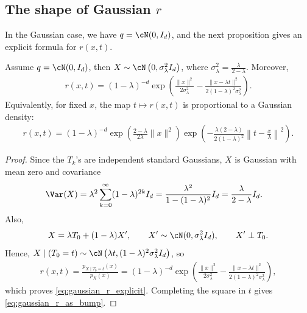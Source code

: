 \subsection{The shape of Gaussian $r$}
In the Gaussian case, we have $q=\cN(0,I_d)$, and the next proposition gives an explicit formula for $r(x,t)$.

\begin{proposition}
    \label{prop:gaussian_relative_density_shape}
    Assume $q=\cN(0,I_d)$, then
    $X\sim \cN\left(0,\sigma_\lambda^2 I_d\right)$, where $\sigma_\lambda^2=\frac{\lambda}{2-\lambda}$.
    Moreover,
    \begin{align}
        r(x,t)
        =
        (1-\lambda)^{-d}
        \exp\left(
        \frac{\|x\|^2}{2\sigma_\lambda^2}
        -
        \frac{\|x-\lambda t\|^2}{2(1-\lambda)^2\sigma_\lambda^2}
        \right).
        \label{eq:gaussian_r_explicit}
    \end{align}
    Equivalently, for fixed $x$, the map $t\mapsto r(x,t)$ is proportional to a Gaussian density:
    \begin{align}
        r(x,t)
        =
        (1-\lambda)^{-d}
        \exp\left(
        \frac{2-\lambda}{2\lambda}\|x\|^2
        \right)
        \exp\left(
        -
        \frac{\lambda(2-\lambda)}{2(1-\lambda)^2}
        \left\|t-\frac{x}{\lambda}\right\|^2
        \right).
        \label{eq:gaussian_r_as_bump}
    \end{align}
\end{proposition}

\begin{proof}
    Since the $T_k$'s are independent standard Gaussians, $X$ is Gaussian with mean zero and covariance
    \begin{align}
        \Var(X)
         & =
        \lambda^2
        \sum_{k=0}^{\infty}
        (1-\lambda)^{2k} I_d
        =
        \frac{\lambda^2}{1-(1-\lambda)^2} I_d
        =
        \frac{\lambda}{2-\lambda} I_d .
    \end{align}
    Also,
    \begin{align}
        X=\lambda T_0+(1-\lambda)X',
        \qquad
        X'\sim \cN(0,\sigma_\lambda^2 I_d),
        \qquad
        X'\perp T_0 .
    \end{align}
    Hence,
    $X\mid (T_0=t)
        \sim
        \cN\left(
        \lambda t,
        (1-\lambda)^2\sigma_\lambda^2 I_d
        \right)$,
    so
    \begin{align}
        r(x,t)
        =
        \frac{p_{X\mid T_0=t}(x)}{p_X(x)}
        =
        (1-\lambda)^{-d}
        \exp\left(
        \frac{\|x\|^2}{2\sigma_\lambda^2}
        -
        \frac{\|x-\lambda t\|^2}{2(1-\lambda)^2\sigma_\lambda^2}
        \right),
    \end{align}
    which proves \eqref{eq:gaussian_r_explicit}. Completing the square in $t$ gives
    \eqref{eq:gaussian_r_as_bump}.
\end{proof}


